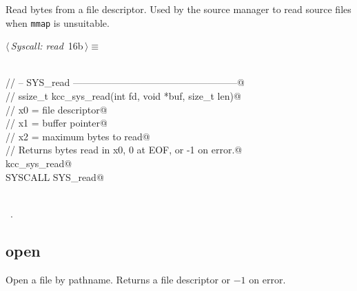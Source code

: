 \documentclass[11pt,a4paper,twoside,openright,DIV=15]{scrbook}
\theoremstyle{definition}
\theoremstyle{plain}
\theoremstyle{remark}
\begin{document}
Read bytes from a file descriptor.  Used by the source manager to read source files when
\texttt{mmap} is unsuitable.

\begin{flushleft} \small
\begin{minipage}{\linewidth}\label{scrap5}\raggedright\small
{} $\langle\,${\itshape Syscall: read}\nobreak\ {\footnotesize {16b}}$\,\rangle\equiv$
\vspace{-1ex}
\begin{list}{}{} \item
\mbox{}\verb@@\\
\mbox{}\verb@// -- SYS_read ---------------------------------------------------@\\
\mbox{}\verb@// ssize_t kcc_sys_read(int fd, void *buf, size_t len)@\\
\mbox{}\verb@//   x0 = file descriptor@\\
\mbox{}\verb@//   x1 = buffer pointer@\\
\mbox{}\verb@//   x2 = maximum bytes to read@\\
\mbox{}\verb@// Returns bytes read in x0, 0 at EOF, or -1 on error.@\\
\mbox{}\verb@FUNC kcc_sys_read@\\
\mbox{}\verb@    SYSCALL SYS_read@\\
\mbox{}\verb@ENDFUNC@\\
\mbox{}\verb@@{\NWsep}
\end{list}
\vspace{-1.5ex}
\footnotesize
\begin{list}{}{\setlength{\itemsep}{-\parsep}\setlength{\itemindent}{-\leftmargin}}
\item \NWtxtMacroRefIn\ .

\item{}
\end{list}
\end{minipage}\vspace{4ex}
\end{flushleft}
\subsection{open}

Open a file by pathname.  Returns a file descriptor or $-1$ on error.
\end{document}

